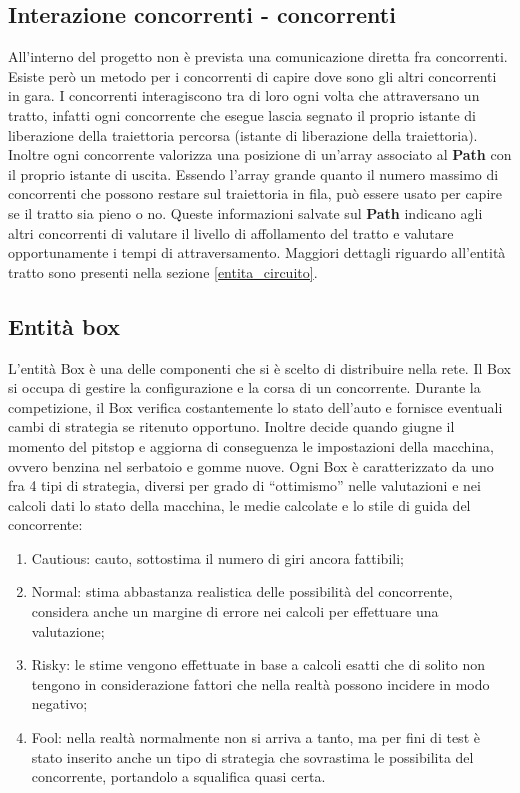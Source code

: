\subsection{Interazione concorrenti - concorrenti}
All'interno del progetto non è prevista una comunicazione diretta fra
concorrenti. Esiste però un metodo per i concorrenti di capire dove sono gli
altri concorrenti in gara. I concorrenti interagiscono tra di loro ogni volta
che attraversano un tratto, infatti ogni concorrente che esegue lascia segnato
il proprio istante di liberazione della traiettoria percorsa (istante di liberazione della traiettoria). 
Inoltre ogni concorrente valorizza una posizione di un'array associato al \textbf{Path}
con il proprio istante di uscita. Essendo l'array grande quanto il numero massimo di concorrenti
che possono restare sul traiettoria in fila, può essere usato per capire se il tratto sia pieno o no.
Queste informazioni salvate sul \textbf{Path}
indicano agli altri concorrenti di valutare il livello di affollamento del tratto e valutare
opportunamente i tempi di attraversamento. Maggiori dettagli riguardo all'entità tratto sono presenti nella sezione
\ref{entita_circuito}.
\subsection{Entità box}
L'entità Box è una delle componenti che si è scelto di distribuire nella rete.
Il Box si occupa di gestire la configurazione e la corsa di un concorrente.
Durante la competizione, il Box verifica costantemente lo stato dell'auto e
fornisce eventuali cambi di strategia se ritenuto opportuno. Inoltre decide
quando giugne il momento del pitstop e aggiorna di conseguenza le impostazioni
della macchina, ovvero benzina nel serbatoio e gomme nuove. Ogni Box è
caratterizzato da uno fra 4 tipi di strategia, diversi per grado di
``ottimismo'' nelle valutazioni e nei calcoli dati lo stato della macchina, le
medie calcolate e lo stile di guida del concorrente:
\begin{enumerate}
\item Cautious: cauto, sottostima il numero di giri ancora fattibili;
\item Normal: stima abbastanza realistica delle possibilità del concorrente,
considera anche un margine di errore nei calcoli per effettuare una valutazione;
\item Risky: le stime vengono effettuate in base a calcoli esatti che di solito
non tengono in considerazione fattori che nella realtà possono incidere in modo
negativo;
\item Fool: nella realtà normalmente non si arriva a tanto, ma per fini di test
è stato inserito anche un tipo di strategia che sovrastima le possibilita del
concorrente, portandolo a squalifica quasi certa.
\end{enumerate}
